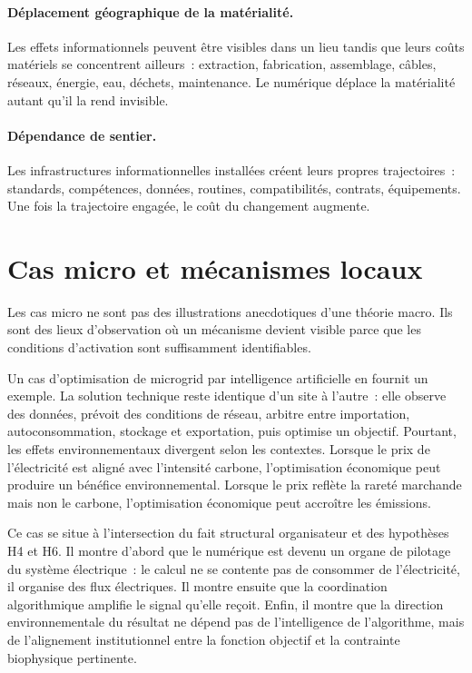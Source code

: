 \paragraph{Déplacement géographique de la matérialité.}
Les effets informationnels peuvent être visibles dans un lieu tandis que leurs coûts matériels se concentrent ailleurs~: extraction, fabrication, assemblage, câbles, réseaux, énergie, eau, déchets, maintenance. Le numérique déplace la matérialité autant qu'il la rend invisible.

\paragraph{Dépendance de sentier.}
Les infrastructures informationnelles installées créent leurs propres trajectoires~: standards, compétences, données, routines, compatibilités, contrats, équipements. Une fois la trajectoire engagée, le coût du changement augmente.

\section{Cas micro et mécanismes locaux}

Les cas micro ne sont pas des illustrations anecdotiques d'une théorie macro. Ils sont des lieux d'observation où un mécanisme devient visible parce que les conditions d'activation sont suffisamment identifiables.

Un cas d'optimisation de microgrid par intelligence artificielle en fournit un exemple. La solution technique reste identique d'un site à l'autre~: elle observe des données, prévoit des conditions de réseau, arbitre entre importation, autoconsommation, stockage et exportation, puis optimise un objectif. Pourtant, les effets environnementaux divergent selon les contextes. Lorsque le prix de l'électricité est aligné avec l'intensité carbone, l'optimisation économique peut produire un bénéfice environnemental. Lorsque le prix reflète la rareté marchande mais non le carbone, l'optimisation économique peut accroître les émissions.

Ce cas se situe à l'intersection du fait structural organisateur et des hypothèses H4 et H6. Il montre d'abord que le numérique est devenu un organe de pilotage du système électrique~: le calcul ne se contente pas de consommer de l'électricité, il organise des flux électriques. Il montre ensuite que la coordination algorithmique amplifie le signal qu'elle reçoit. Enfin, il montre que la direction environnementale du résultat ne dépend pas de l'intelligence de l'algorithme, mais de l'alignement institutionnel entre la fonction objectif et la contrainte biophysique pertinente.

